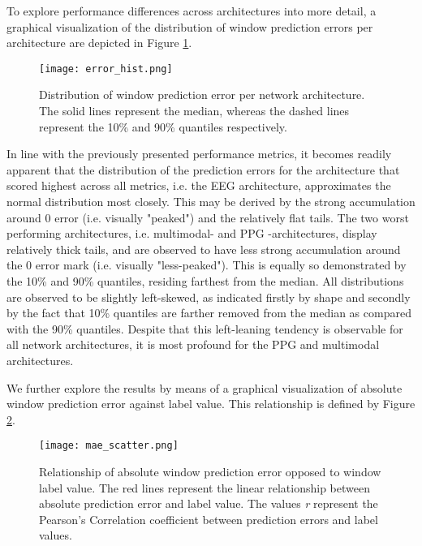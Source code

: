 \documentclass[fleqn,11pt]{paper}
\begin{document}
To explore performance differences across architectures into more detail, a graphical visualization of the distribution of window prediction errors per architecture are depicted in Figure \ref{fig:mae_hist}.

\vspace{7mm}
\begin{figure}[h]
\centering
\texttt{[image: error\_hist.png]}
\vspace{2mm}
\caption{Distribution of window prediction error per network architecture. The solid lines represent the median, whereas the dashed lines represent the 10\% and 90\% quantiles respectively. } \label{fig:mae_hist}
\end{figure}
\vspace{7mm}

In line with the previously presented performance metrics, it becomes readily apparent that the distribution of the prediction errors for the architecture that scored highest across all metrics, i.e. the EEG architecture, approximates the normal distribution most closely. This may be derived by the strong accumulation around 0 error (i.e. visually "peaked") and the relatively flat tails. The two worst performing architectures, i.e. multimodal- and PPG -architectures, display relatively thick tails, and are observed to have less strong accumulation around the 0 error mark (i.e. visually "less-peaked"). This is equally so demonstrated by the 10\% and 90\% quantiles, residing farthest from the median.  All distributions are observed to be slightly left-skewed, as indicated firstly by shape and secondly by the fact that 10\% quantiles are farther removed from the median as compared with the 90\% quantiles. Despite that this left-leaning tendency is observable for all network architectures, it is most profound for the PPG and multimodal architectures. 

\newpage
We further explore the results by means of a graphical visualization of absolute window prediction error against label value. This relationship is defined by Figure \ref{fig:mae_scatter}.

\vspace{7mm}
\begin{figure}[h]
\centering
\texttt{[image: mae\_scatter.png]}
\caption{Relationship of absolute window prediction error opposed to window label value. The red lines represent the linear relationship between absolute prediction error and label value. The values \textit{r} represent the Pearson's Correlation coefficient between prediction errors and label values.} \label{fig:mae_scatter}
\end{figure}
\vspace{7mm}
\end{document}
